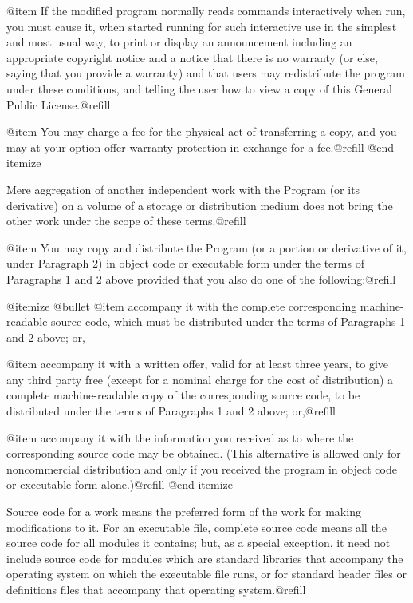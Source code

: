 @item
If the modified program normally reads commands interactively when
run, you must cause it, when started running for such interactive use
in the simplest and most usual way, to print or display an
announcement including an appropriate copyright notice and a notice
that there is no warranty (or else, saying that you provide a
warranty) and that users may redistribute the program under these
conditions, and telling the user how to view a copy of this General
Public License.@refill

@item
You may charge a fee for the physical act of transferring a
copy, and you may at your option offer warranty protection in
exchange for a fee.@refill
@end itemize

Mere aggregation of another independent work with the Program (or its
derivative) on a volume of a storage or distribution medium does not bring
the other work under the scope of these terms.@refill

@item
You may copy and distribute the Program (or a portion or derivative of
it, under Paragraph 2) in object code or executable form under the terms
of Paragraphs 1 and 2 above provided that you also do one of the
following:@refill

@itemize @bullet
@item
accompany it with the complete corresponding machine-readable
source code, which must be distributed under the terms of
Paragraphs 1 and 2 above; or,

@item
accompany it with a written offer, valid for at least three
years, to give any third party free (except for a nominal charge
for the cost of distribution) a complete machine-readable copy of the
corresponding source code, to be distributed under the terms of
Paragraphs 1 and 2 above; or,@refill

@item
accompany it with the information you received as to where the
corresponding source code may be obtained.  (This alternative is
allowed only for noncommercial distribution and only if you
received the program in object code or executable form alone.)@refill
@end itemize

Source code for a work means the preferred form of the work for making
modifications to it.  For an executable file, complete source code means
all the source code for all modules it contains; but, as a special
exception, it need not include source code for modules which are standard
libraries that accompany the operating system on which the executable
file runs, or for standard header files or definitions files that
accompany that operating system.@refill

